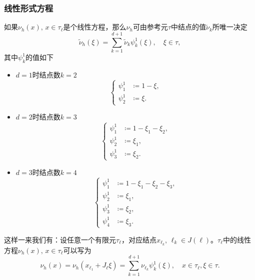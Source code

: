 \subsubsection{线性形式方程}
如果$\nu_{h}(x), \, x \in \tau_{\ell}$是个线性方程，那么$\nu_{h}$可由参考元$\tau$中结点的值$\widetilde{\nu}_{k}$所唯一决定
\begin{equation}
  \label{eq:finele-form-lin-nuh-nuk}
  \widetilde{\nu}_{h}\left( \xi \right)
  = \sum_{k=1}^{d+1} \widetilde{\nu}_{k} \psi_{k}^{1}\left( \xi \right), \quad \xi \in \tau,
\end{equation}
其中$\psi_{k}^{1}$的值如下
\begin{itemize}
  \item $d=1$时结点数$k=2$
  \begin{equation*}
    \begin{cases}
      \psi_{1}^{1} & \coloneqq 1 - \xi,\\
      \psi_{2}^{1} & \coloneqq \xi.
    \end{cases}
  \end{equation*}
  \item $d=2$时结点数$k=3$
  \begin{equation*}
    \begin{cases}
      \psi_{1}^{1} & \coloneqq 1 - \xi_{1} - \xi_{2}, \\
      \psi_{2}^{1} & \coloneqq \xi_{1}, \\
      \psi_{3}^{1} & \coloneqq \xi_{2}.
    \end{cases}
  \end{equation*}
  \item $d=3$时结点数$k=4$
  \begin{equation*}
    \begin{cases}
      \psi_{1}^{1} & \coloneqq 1 - \xi_{1} - \xi_{2} - \xi_{3}, \\
      \psi_{2}^{1} & \coloneqq \xi_{1}, \\
      \psi_{3}^{1} & \coloneqq \xi_{2}, \\
      \psi_{4}^{1} & \coloneqq \xi_{3}.
    \end{cases}
  \end{equation*}
\end{itemize}

这样一来我们有：设任意一个有限元$\tau_{\ell}$，对应结点$x_{\ell_{k}}, \, \ell_{k} \in J(\ell)$。$\tau_{\ell}$中的线性方程$\nu_{h}(x), \, x \in \tau_{\ell}$可以写为
\begin{equation}
  \label{eq:finele-form-lin-nuh-reprensentation}
  \nu_{h} \left( x \right)
  = \nu_{h} \left( x_{\ell_{1}} + J_{\ell} \xi \right)
  = \sum_{k=1}^{d+1} \nu_{\ell_{k}} \psi_{k}^{1} \left( \xi \right), \quad x \in \tau_{\ell}, \xi \in \tau.
\end{equation}

